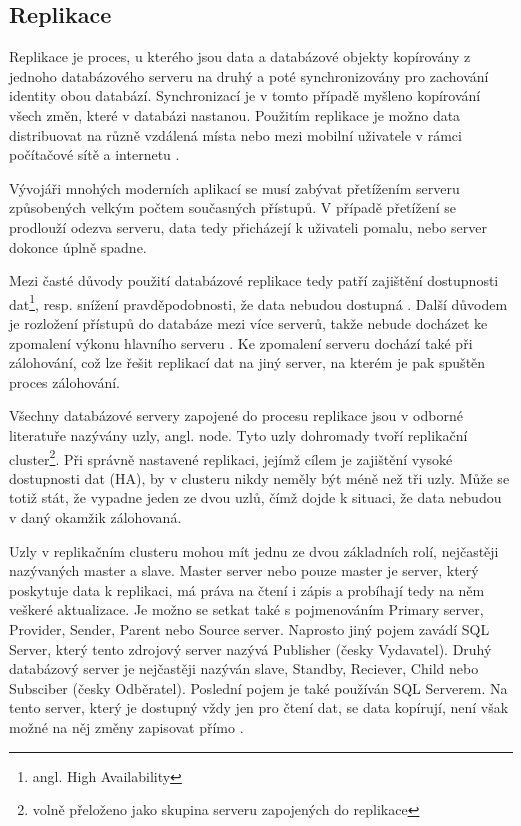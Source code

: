         \subsection{Replikace}
        \label{kReplikace}
Replikace je proces, u kterého jsou data a databázové objekty kopírovány z jednoho databázového serveru na druhý a poté synchronizovány pro zachování identity obou databází. Synchronizací je v tomto případě myšleno kopírování všech změn, které v databázi nastanou. Použitím replikace je možno data distribuovat na různě vzdálená místa nebo mezi mobilní uživatele v rámci počítačové sítě a internetu \citep{Microsoft2013}.

Vývojáři mnohých moderních aplikací se musí zabývat přetížením serveru způsobených velkým počtem současných přístupů. V případě přetížení se prodlouží odezva serveru, data tedy přicházejí k uživateli pomalu, nebo server dokonce úplně spadne. 

Mezi časté důvody použití databázové replikace tedy patří zajištění dostupnosti dat\footnote{angl. High Availability}, resp. snížení pravděpodobnosti, že data nebudou dostupná \citep{ObeHsu2012}. Další důvodem je rozložení přístupů do databáze mezi více serverů, takže nebude docházet ke zpomalení výkonu hlavního serveru \citep{BellKindahlThalmann2010}. Ke zpomalení serveru dochází také při zálohování, což lze řešit replikací dat na jiný server, na kterém je pak spuštěn proces zálohování. 

Všechny databázové servery zapojené do procesu replikace jsou v odborné literatuře nazývány uzly, angl. node. Tyto uzly dohromady tvoří replikační cluster\footnote{volně přeloženo jako skupina serveru zapojených do replikace}. Při správně nastavené replikaci, jejímž cílem je zajištění vysoké dostupnosti dat (HA), by v clusteru nikdy neměly být méně než tři uzly. Může se totiž stát, že vypadne jeden ze dvou uzlů, čímž dojde k situaci, že data nebudou v daný okamžik zálohovaná. 

Uzly v replikačním clusteru mohou mít jednu ze dvou základních rolí, nejčastěji nazývaných master a slave. Master server nebo pouze master je server, který poskytuje data k replikaci, má práva na čtení i zápis a probíhají tedy na něm veškeré aktualizace. Je možno se setkat také s pojmenováním Primary server, Provider, Sender, Parent nebo Source server. Naprosto jiný pojem zavádí SQL Server, který tento zdrojový server nazývá Publisher (česky Vydavatel). Druhý databázový server je nejčastěji nazýván slave, Standby, Reciever, Child nebo Subsciber (česky Odběratel). Poslední pojem je také používán SQL Serverem. Na tento server, který je dostupný vždy jen pro čtení dat, se data kopírují, není však možné na něj změny zapisovat přímo \citep{RiggsKrossing2010}.

